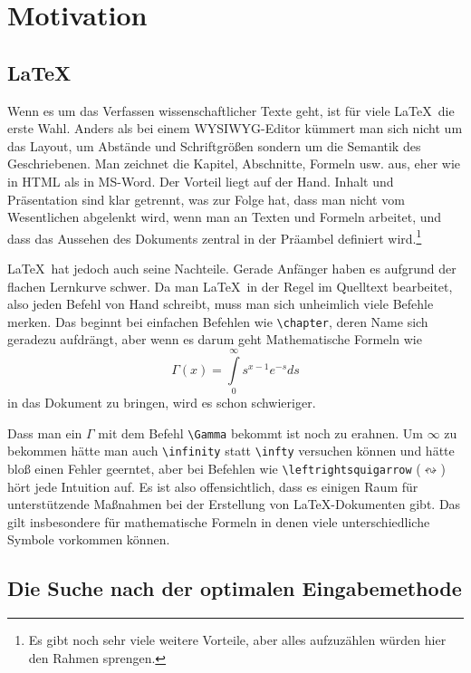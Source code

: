 \chapter{Motivation}

\section{\LaTeX}

Wenn es um das Verfassen wissenschaftlicher Texte geht, ist für viele \LaTeX\ die erste Wahl. Anders als bei einem \ac{WYSIWYG}-Editor kümmert man sich nicht um das Layout, um Abstände und Schriftgrößen sondern um die Semantik des Geschriebenen. Man zeichnet die Kapitel, Abschnitte, Formeln usw. aus, eher wie in \ac{HTML} als in MS-Word. Der Vorteil liegt auf der Hand. Inhalt und Präsentation sind klar getrennt, was zur Folge hat, dass man nicht vom Wesentlichen abgelenkt wird, wenn man an Texten und Formeln arbeitet, und dass das Aussehen des Dokuments zentral in der Präambel definiert wird.\footnote{Es gibt noch sehr viele weitere Vorteile, aber alles aufzuzählen würden hier den Rahmen sprengen.}

\LaTeX~hat jedoch auch seine Nachteile. Gerade Anfänger haben es aufgrund der flachen Lernkurve schwer. Da man \LaTeX~in der Regel im Quelltext bearbeitet, also jeden Befehl von Hand schreibt, muss man sich unheimlich viele Befehle merken. Das beginnt bei einfachen Befehlen wie \texttt{\textbackslash chapter}, deren Name sich geradezu aufdrängt, aber wenn es darum geht Mathematische Formeln wie $$\Gamma \left( x \right) = \int\limits_0^\infty  {s^{x - 1} e^{ - s} ds}$$ in das Dokument zu bringen, wird es schon schwieriger.

Dass man ein $\Gamma$ mit dem Befehl \texttt{\textbackslash Gamma} bekommt ist noch zu erahnen. Um $\infty$ zu bekommen hätte man auch \texttt{\textbackslash infinity} statt \texttt{\textbackslash infty} versuchen können und hätte bloß einen Fehler geerntet, aber bei Befehlen wie \texttt{\textbackslash leftrightsquigarrow} ($\leftrightsquigarrow$) hört jede Intuition auf. Es ist also offensichtlich, dass es einigen Raum für unterstützende Maßnahmen bei der Erstellung von \LaTeX-Dokumenten gibt. Das gilt insbesondere für mathematische Formeln in denen viele unterschiedliche Symbole vorkommen können.

\section{Die Suche nach der optimalen Eingabemethode}
\label{sec:optimal}

